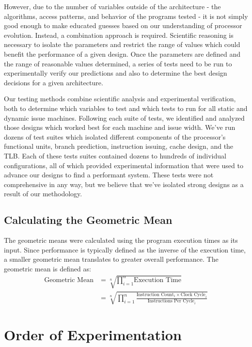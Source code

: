 \documentclass[paper=a4, fontsize=12pt]{scrartcl} %
\numberwithin{equation}{section} %
\numberwithin{figure}{section} %
\numberwithin{table}{section} %
\begin{document}
However, due to the number of variables outside of the architecture - the algorithms, access patterns, and behavior of the programs tested - it is not simply good enough to make educated guesses based on our understanding of processor evolution. Instead, a combination approach is required. Scientific reasoning is necessary to isolate the parameters and restrict the range of values which could benefit the performance of a given design. Once the parameters are defined and the range of reasonable values determined, a series of tests need to be run to experimentally verify our predictions and also to determine the best design decisions for a given architecture.

Our testing methods combine scientific analysis and experimental verification, both to determine which variables to test and which tests to run for all static and dynamic issue machines. Following each suite of tests, we identified and analyzed those designs which worked best for each machine and issue width. We've run dozens of test suites which isolated different components of the processor's functional units, branch prediction, instruction issuing, cache design, and the TLB. Each of these tests suites contained dozens to hundreds of individual configurations, all of which provided experimental information that were used to advance our designs to find a performant system. These tests were not comprehensive in any way, but we believe that we've isolated strong designs as a result of our methodology.

\subsection{Calculating the Geometric Mean}

The geometric means were calculated using the program execution times as its input. Since performance is typically defined as the inverse of the execution time, a smaller geometric mean translates to greater overall performance. The geometric mean is defined as:
\begin{align*}
	\text{Geometric Mean} &= \sqrt[n] {\prod_{i=1}^{n} \text{Execution Time}} \\
	&= \sqrt[n] {\prod_{i=1}^{n} \frac{\text{Instruction Count}_i \times \text{Clock Cycle}_i}{\text{Instructions Per Cycle}_i}} 
\end{align*}


\section{Order of Experimentation}
\end{document}
